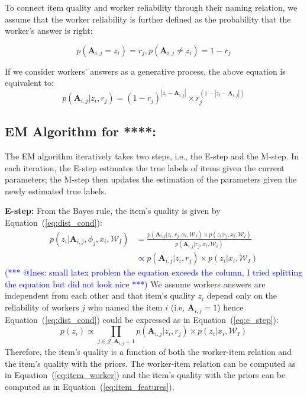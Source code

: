 \documentclass{article}
\makeatletter
\newcommand{\sys}{****\xspace}
\newcommand{\iar}[1]{\textcolor{blue}{(*** @Ines: #1 ***)}}
\makeatother
\begin{document}
To connect item quality and worker reliability through their naming relation, we assume that the worker reliability is further defined as the probability that the worker's answer is right:

\begin{equation}
    p(\mathbf{A}_{i,j} = z_i) =  r_j, p(\mathbf{A}_{i,j} \ne z_i) = 1- r_j
    \label{eq:item_worker_rel}
\end{equation}

If we consider workers' answers as a generative process, the above equation is equivalent to:
\begin{equation}
    p(\mathbf{A}_{i,j} | z_i,  r_j) = (1- r_j)^{|z_i-\mathbf{A}_{i,j}|}\times  r_j^{(1-|z_i-\mathbf{A}_{i,j}|)}
    \label{eq:item_worker}
\end{equation}

\subsection{EM Algorithm for \sys:} 
The EM algorithm iteratively takes two steps, i.e., the E-step and the
M-step. In each iteration, the E-step estimates the true labels of items given
the current parameters; the M-step then updates the estimation of
the parameters given the newly estimated true labels.

\noindent\textbf{E-step:}
From the Bayes rule, the item's quality is given by Equation~(\ref{eq:dist_cond}):
\begin{align}
    p(z_i|\mathbf{A}_{i,j},\phi_{j},x_i,\mathcal{W}_I)&=\frac{p(\mathbf{A}_{i,j}|z_i,r_j,x_i,\mathcal{W}_I)\times p(z_i|r_j,x_i,\mathcal{W}_I)}{p(\mathbf{A}_{i,j}|r_j,x_i,\mathcal{W}_I)}\nonumber\\
        &\propto p(\mathbf{A}_{i,j}|z_i,r_j)\times p(z_i|x_i,\mathcal{W}_I)
    \label{eq:dist_cond}
\end{align}
\iar{small latex problem the equation exceeds the column, I tried splitting the equation but did not look nice}
We assume workers answers are independent from each other and 
that item's quality $z_i$ depend only on the reliability of workers $j$ who named the
item $i$ (i.e, $\mathbf{A}_{i,j}=1$) hence Equation~(\ref{eq:dist_cond})
could be expressed as in Equation~(\ref{eq:e_step}):
\begin{equation}
    p(z_i) \propto \prod_{j \in \mathcal{J},\mathbf{A}_{i,j}=1} p(\mathbf{A}_{i,j}|z_i,r_{j})\times p(z_i|x_i,\mathcal{W}_I)
    \label{eq:e_step}
\end{equation}
Therefore, the item's quality is a function of both the worker-item relation and the item's quality with the priors.
The worker-item relation can be computed as in Equation~(\ref{eq:item_worker}) and the item's quality with 
the priors can be computed as in Equation~(\ref{eq:item_features}).
\end{document}
